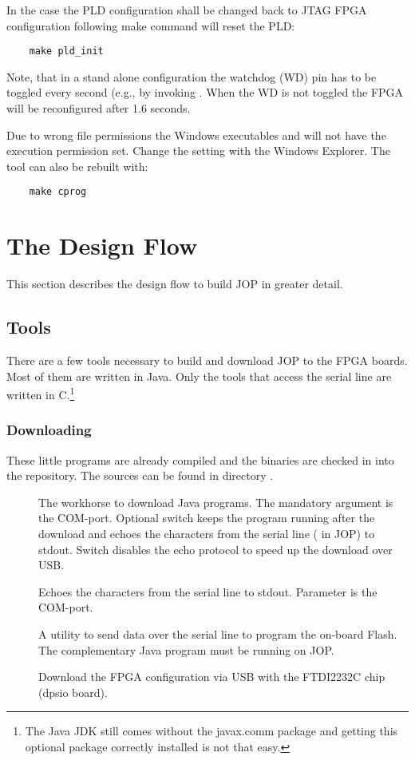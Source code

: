 In the case the PLD configuration shall be changed back to JTAG FPGA
configuration following make command will reset the PLD:
\begin{lstlisting}
    make pld_init
\end{lstlisting}

Note, that in a stand alone configuration the watchdog (WD) pin has
to be toggled every second (e.g., by invoking .
When the WD is not toggled the FPGA will be reconfigured after 1.6
seconds.

Due to wrong file permissions the Windows executables 
and  will not have the execution permission set.
Change the setting with the Windows Explorer. The tool 
can also be rebuilt with:
\begin{lstlisting}
    make cprog
\end{lstlisting}


\section{The Design Flow}

This section describes the design flow to build JOP in greater
detail.

\subsection{Tools}

There are a few tools necessary to build and download JOP to the FPGA
boards. Most of them are written in Java. Only the tools that access
the serial line are written in C.\footnote{The Java JDK still comes
without the javax.comm package and getting this optional package
correctly installed is not that easy.}

\subsubsection{Downloading}

These little programs are already compiled and the binaries are
checked in into the repository. The sources can be found in directory
.

\begin{description}
    \item[] The workhorse to download Java programs. The
    mandatory argument is the COM-port. Optional switch 
    keeps the program running after the download and echoes the
    characters from the serial line ( in JOP) to
    stdout. Switch  disables the echo protocol to speed up the
    download over USB.
    \item[] Echoes the characters from the serial line
        to stdout. Parameter is the COM-port.
    \item[] A utility to send data over the serial
        line to program the on-board Flash. The complementary
        Java program  must be running on JOP.
    \item[] Download the FPGA configuration via
    USB with the FTDI2232C chip (dpsio board).
\end{description}

